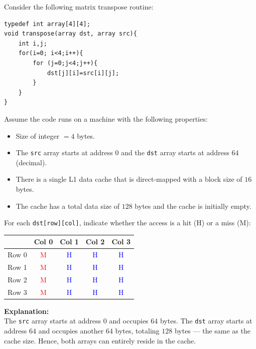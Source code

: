 \documentclass[12pt]{book}
\begin{document}
\begin{example}
    Consider the following matrix transpose routine:
    \begin{lstlisting}[style=cppstyle]
typedef int array[4][4];
void transpose(array dst, array src){
    int i,j;
    for(i=0; i<4;i++){
        for (j=0;j<4;j++){
            dst[j][i]=src[i][j];
        }
    }
}
    \end{lstlisting}
    
    Assume the code runs on a machine with the following properties:
    \begin{itemize}
        \item Size of integer $= 4$ bytes.
        \item The \texttt{src} array starts at address $0$ and the \texttt{dst} array starts at address $64$ (decimal).
        \item There is a single L1 data cache that is direct-mapped with a block size of $16$ bytes.
        \item The cache has a total data size of $128$ bytes and the cache is initially empty.
    \end{itemize}

    For each \texttt{dst[row][col]}, indicate whether the access is a hit (H) or a miss (M):

    \begin{center}
    \begin{tabular}{|c|c|c|c|c|}
        \hline
         & Col 0 & Col 1 & Col 2 & Col 3 \\
        \hline
        Row 0 & \textcolor{red}{M} & \textcolor{blue}{H}&\textcolor{blue}{H}& \textcolor{blue}{H}\\
        \hline
        Row 1 & \textcolor{red}{M}&\textcolor{blue}{H}&\textcolor{blue}{H}&\textcolor{blue}{H} \\
        \hline
        Row 2 &\textcolor{red}{M}&\textcolor{blue}{H}&\textcolor{blue}{H}& \textcolor{blue}{H}\\
        \hline
        Row 3 &\textcolor{red}{M} &\textcolor{blue}{H} &\textcolor{blue}{H}&\textcolor{blue}{H}\\
        \hline
    \end{tabular}
    \end{center}

    \textbf{Explanation:} \\
    The \texttt{src} array starts at address $0$ and occupies $64$ bytes. The \texttt{dst} array starts at address $64$ and occupies another $64$ bytes, totaling $128$ bytes — the same as the cache size. Hence, both arrays can entirely reside in the cache.


\end{example}
\end{document}
